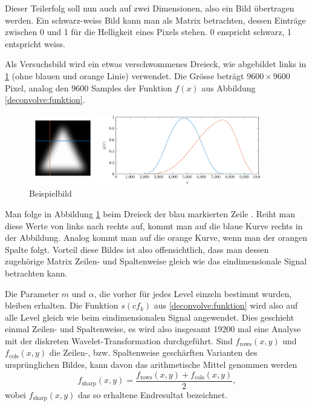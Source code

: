 Dieser Teilerfolg soll nun auch auf zwei Dimensionen, also ein Bild übertragen werden.
Ein schwarz-weiss Bild kann man als Matrix betrachten, dessen Einträge zwischen 0 und 1 für die Helligkeit eines Pixels stehen.
0 enspricht schwarz, 1 entspricht weiss.

Als Versuchsbild wird ein etwas verschwommenes Dreieck, wie abgebildet links in \ref{deconvolve:example} (ohne blauen und orange Linie) verwendet.
Die Grösse beträgt $9600\times9600$ Pixel, analog den 9600 Samples der Funktion $f(x)$ aus Abbildung \ref{deconvolve:funktion}.
\begin{figure}[h]
\centering
\includegraphics[width=0.9\textwidth]{./papers/deconvolve/pictures/dreieck.pdf}
\caption{Beispielbild\label{deconvolve:example}}
\end{figure}

Man folge in Abbildung \ref{deconvolve:example} beim Dreieck der blau markierten \glqq Zeile \grqq{}.
Reiht man diese Werte von links nach rechts auf, kommt man auf die blaue Kurve rechts in der Abbildung.
Analog kommt man auf die orange Kurve, wenn man der orangen \glqq Spalte \grqq{} folgt.
Vorteil diese Bildes ist also offensichtlich, dass man dessen zugehörige Matrix Zeilen- und Spaltenweise gleich wie das eindimensionale Signal betrachten kann.

Die Parameter $m$ und $\alpha$, die vorher für jedes Level einzeln bestimmt wurden, bleiben erhalten.
Die Funktion $s(cf_k)$ aus \eqref{deconvolve:funktion} wird also auf alle Level gleich wie beim eindimensionalen Signal angewendet.
Dies geschieht einmal Zeilen- und Spaltenweise, es wird also insgesamt 19200 mal eine Analyse mit der diskreten Wavelet-Transformation durchgeführt.
Sind $f_\text{rows}(x,y)$ und $f_\text{cols}(x,y)$ die Zeilen-, bzw. Spaltenweise \glqq geschärften\grqq{} Varianten des ursprünglichen Bildes, kann davon das arithmetische Mittel genommen werden
$$f_\text{sharp}(x,y)=\frac{f_\text{rows}(x,y)+f_\text{cols}(x,y)}{2},$$
wobei $f_\text{sharp}(x,y)$ das so erhaltene Endresultat bezeichnet.

